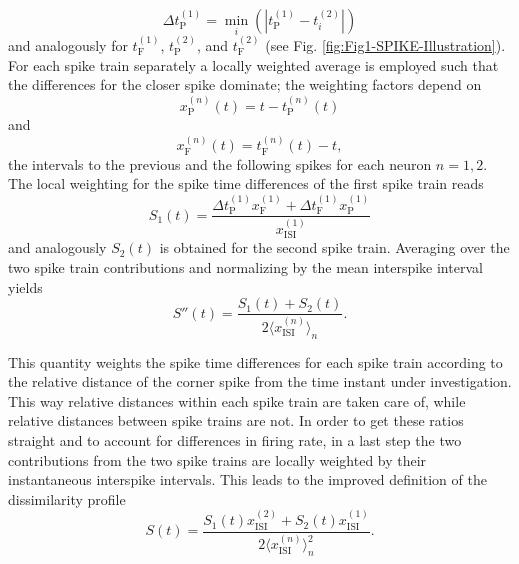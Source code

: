 \documentclass[10pt,twocolumn]{elsart5p}
\begin{document}
%
\begin{equation} \label{eq:Delta-Corner-Spike}
     \Delta t_{\mathrm {P}}^{(1)} = \min_i (| t_{\mathrm {P}}^{(1)} - t_i^{(2)} |)
\end{equation}
%
and analogously for $t_{\mathrm {F}}^{(1)}$, $t_{\mathrm {P}}^{(2)}$, and $t_{\mathrm {F}}^{(2)}$  (see Fig. \ref{fig:Fig1-SPIKE-Illustration}). For each spike train separately a locally weighted average is employed such that the differences for the closer spike dominate; the weighting factors depend on
%
\begin{equation} \label{eq:Prev-Spike-Dist}
     x_{\mathrm {P}}^{(n)} (t) = t - t_{\mathrm {P}}^{(n)} (t)
\end{equation}
%
and
%
\begin{equation} \label{eq:Foll-Spike-Dist}
     x_{\mathrm {F}}^{(n)} (t) = t_{\mathrm {F}}^{(n)} (t) - t,
\end{equation}
%
the intervals to the previous and the following spikes for each neuron $n = 1, 2$. The local weighting for the spike time differences of the first spike train reads
%
\begin{equation} \label{eq:Bi-Spike-Diss-Improved-First}
     S_1 (t) = \frac{\Delta t_{\mathrm {P}}^{(1)} x_{\mathrm {F}}^{(1)} + \Delta t_{\mathrm {F}}^{(1)} x_{\mathrm {P}}^{(1)}}{x_{\mathrm {ISI}}^{(1)}}
\end{equation}
%
and analogously $S_2 (t)$ is obtained for the second spike train. Averaging over the two spike train contributions and normalizing by the mean interspike interval yields
%
\begin{equation} \label{eq:Bi-Spike-Diss-Improved-Intermediate}
     S'' (t) = \frac{S_1 (t) + S_2 (t)}{2 \langle x_{\mathrm {ISI}}^{(n)} \rangle_n}.
\end{equation}

This quantity weights the spike time differences for each spike train according to the relative distance of the corner spike from the time instant under investigation. This way relative distances within each spike train are taken care of, while relative distances between spike trains are not. In order to get these ratios straight and to account for differences in firing rate, in a last step the two contributions from the two spike trains are locally weighted by their instantaneous interspike intervals. This leads to the improved definition of the dissimilarity profile
%
\begin{equation} \label{eq:Bi-Spike-Diss-Improved}
     S (t) = \frac{S_1 (t) x_{\mathrm {ISI}}^{(2)} + S_2 (t) x_{\mathrm {ISI}}^{(1)}}{2 \langle x_{\mathrm {ISI}}^{(n)} \rangle_n^2}.
\end{equation}
\end{document}
